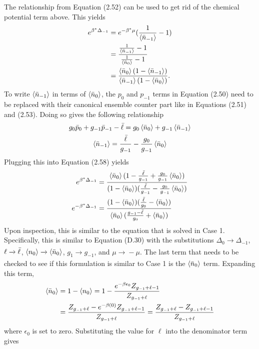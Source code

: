 The relationship from Equation (2.52) can be used to get rid of the chemical potential term above. This yields
\begin{align}
    e^{\beta^*\Delta_{-1}}&=e^{-\beta^*\mu}(\frac{1}{\left<{\Bar{n}_{-1}}\right>}-1)\\
    &=\frac{\frac{1}{\left<{\Bar{n}_{-1}}\right>}-1}{\frac{1}{\left<{\Bar{n}_0}\right>}-1}\\
    &=\frac{\left<{\Bar{n}_0}\right>(1-\left<{\Bar{n}_{-1}}\right>)}{\left<{\Bar{n}_{-1}}\right>(1-\left<{\Bar{n}_0}\right>)}.
\end{align}
To write $\left<{\Bar{n}_{-1}}\right>$ in terms of $\left<{\Bar{n}_0}\right>$, the $p_0$ and $p_{-1}$ terms in Equation (2.50) need to be replaced with their canonical ensemble counter part like in Equations (2.51) and (2.53). Doing so gives the following relationship
\begin{gather}
    g_0\Bar{p}_0+g_{-1}\Bar{p}_{-1}-\Bar{\ell}=g_0\left<{\Bar{n}_0}\right>+g_{-1}\left<{\Bar{n}_{-1}}\right>\\
    \left<{\Bar{n}_{-1}}\right>=\frac{\Bar{\ell}}{g_{-1}}-\frac{g_0}{g_{-1}}\left<{\Bar{n}_0}\right>
\end{gather}
Plugging this into Equation (2.58) yields
\begin{align}
    e^{\beta^*\Delta_{-1}}&=\frac{\left<{\Bar{n}_0}\right>(1-\frac{\Bar{\ell}}{g_{-1}}+\frac{g_0}{g_{-1}}\left<{\Bar{n}_0}\right>)}{(1-\left<{\Bar{n}_0}\right>)(\frac{\Bar{\ell}}{g_{-1}}-\frac{g_0}{g_{-1}}\left<{\Bar{n}_0}\right>)}\\
    e^{-\beta^*\Delta_{-1}}&=\frac{(1-\left<{\Bar{n}_0}\right>)(\frac{\Bar{\ell}}{g_0}-\left<{\Bar{n}_0}\right>)}{\left<{\Bar{n}_0}\right>(\frac{g_{-1}-\Bar{\ell}}{g_0}+\left<{\Bar{n}_0}\right>)}
\end{align}
Upon inspection, this is similar to the equation that is solved in Case 1. Specifically, this is similar to Equation (D.30) with the substitutions $\Delta_0\xrightarrow[]{}\Delta_{-1}$, $\ell\xrightarrow[]{}\Bar{\ell}$, $\left<{n_0}\right>\xrightarrow[]{}\left<{\Bar{n}_0}\right>$, $g_1\xrightarrow[]{}g_{-1}$, and $\mu \xrightarrow[]{}-\mu$. The last term that needs to be checked to see if this formulation is similar to Case 1 is the $\left<{\Bar{n}_0}\right>$ term. Expanding this term, 
\begin{align}
    \left<{\Bar{n}_0}\right>&=1-\left<{n_0}\right>=1-\frac{e^{-\beta\epsilon_0}Z_{g_{-1}+\ell-1}}{Z_{g_{-1}+\ell}}\\
    &=\frac{Z_{g_{-1}+\ell}-e^{-\beta (0)}Z_{g_{-1}+\ell-1}}{Z_{g_{-1}+\ell}}=\frac{Z_{g_{-1}+\ell}-Z_{g_{-1}+\ell-1}}{Z_{g_{-1}+\ell}}
\end{align}
where $\epsilon_0$ is set to zero. Substituting the value for $\ell$ into the denominator term gives
